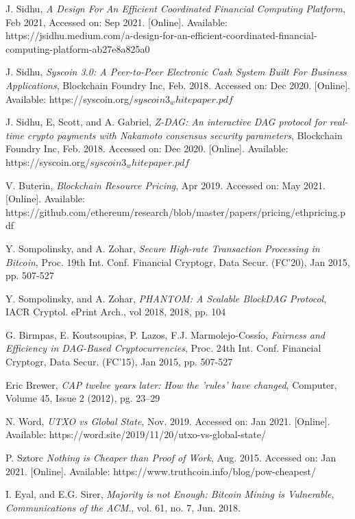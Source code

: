 \documentclass[peerreview]{ieeesyscoin}
\begin{document}
\begin{thebibliography}{00}

 J. Sidhu, \textit{A Design For An Efficient Coordinated Financial Computing Platform}, Feb 2021, Accessed on: Sep 2021.  [Online]. Available:  https://jsidhu.medium.com/a-design-for-an-efficient-coordinated-financial-computing-platform-ab27e8a825a0

 J. Sidhu, \textit{Syscoin 3.0: A Peer-to-Peer Electronic Cash System Built For Business Applications}, Blockchain Foundry Inc, Feb. 2018. Accessed on: Dec 2020. [Online]. Available: https://syscoin.org/$syscoin3_whitepaper.pdf$

 J. Sidhu, E, Scott, and A. Gabriel, \textit{Z-DAG: An interactive DAG protocol for real-time crypto payments with Nakamoto consensus security parameters}, Blockchain Foundry Inc, Feb. 2018. Accessed on: Dec 2020. [Online]. Available: https://syscoin.org/$syscoin3_whitepaper.pdf$

 V. Buterin,  \textit{Blockchain Resource Pricing}, Apr 2019. Accessed on: May 2021. [Online]. Available: https://github.com/ethereum/research/blob/master/papers/pricing/ethpricing.pdf

 Y. Sompolinsky, and A. Zohar, \textit{Secure High-rate Transaction Processing in Bitcoin}, Proc. 19th Int. Conf. Financial Cryptogr, Data Secur. (FC’20), Jan 2015, pp. 507-527

 Y. Sompolinsky, and A. Zohar, \textit{PHANTOM: A Scalable BlockDAG Protocol}, IACR Cryptol. ePrint Arch., vol 2018, 2018,  pp. 104

 G. Birmpas, E. Koutsoupias, P. Lazos, F.J. Marmolejo-Cossío, \textit{Fairness and Efficiency in DAG-Based Cryptocurrencies}, Proc. 24th Int. Conf. Financial Cryptogr, Data Secur. (FC’15), Jan 2015, pp. 507-527

 Eric Brewer, \textit{CAP twelve years later: How the 'rules' have changed}, Computer, Volume 45, Issue 2 (2012), pg. 23–29

 N. Word, \textit{UTXO vs Global State}, Nov. 2019. Accessed on: Jan 2021. [Online]. Available: https://word.site/2019/11/20/utxo-vs-global-state/

 P. Sztorc \textit{Nothing is Cheaper than Proof of Work}, Aug. 2015. Accessed on: Jan 2021. [Online]. Available: https://www.truthcoin.info/blog/pow-cheapest/

 I. Eyal, and E.G. Sirer, \textit{Majority is not Enough: Bitcoin Mining is Vulnerable}, \emph{Communications of the ACM}., vol. 61, no. 7, Jun. 2018.


\end{thebibliography}
\end{document}
